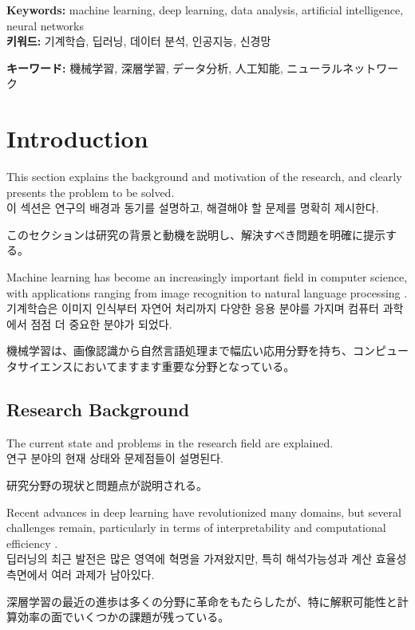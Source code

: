 \documentclass[12pt,a4paper]{article}
\begin{document}
\textbf{Keywords:} machine learning, deep learning, data analysis, artificial intelligence, neural networks \\
\textbf{키워드:} 기계학습, 딥러닝, 데이터 분석, 인공지능, 신경망 \\
\begin{CJK}{UTF8}{min}
\textbf{キーワード:} 機械学習, 深層学習, データ分析, 人工知能, ニューラルネットワーク
\end{CJK}

\section{Introduction}
\label{sec:introduction}

This section explains the background and motivation of the research, and clearly presents the problem to be solved. \\
이 섹션은 연구의 배경과 동기를 설명하고, 해결해야 할 문제를 명확히 제시한다. \\
\begin{CJK}{UTF8}{min}
このセクションは研究の背景と動機を説明し、解決すべき問題を明確に提示する。
\end{CJK}

Machine learning has become an increasingly important field in computer science, with applications ranging from image recognition to natural language processing \cite{bishop2006pattern}. \\
기계학습은 이미지 인식부터 자연어 처리까지 다양한 응용 분야를 가지며 컴퓨터 과학에서 점점 더 중요한 분야가 되었다. \\
\begin{CJK}{UTF8}{min}
機械学習は、画像認識から自然言語処理まで幅広い応用分野を持ち、コンピュータサイエンスにおいてますます重要な分野となっている。
\end{CJK}

\subsection{Research Background}
The current state and problems in the research field are explained. \\
연구 분야의 현재 상태와 문제점들이 설명된다. \\
\begin{CJK}{UTF8}{min}
研究分野の現状と問題点が説明される。
\end{CJK}

Recent advances in deep learning have revolutionized many domains, but several challenges remain, particularly in terms of interpretability and computational efficiency \cite{hinton2006fast}. \\
딥러닝의 최근 발전은 많은 영역에 혁명을 가져왔지만, 특히 해석가능성과 계산 효율성 측면에서 여러 과제가 남아있다. \\
\begin{CJK}{UTF8}{min}
深層学習の最近の進歩は多くの分野に革命をもたらしたが、特に解釈可能性と計算効率の面でいくつかの課題が残っている。
\end{CJK}
\end{document}
